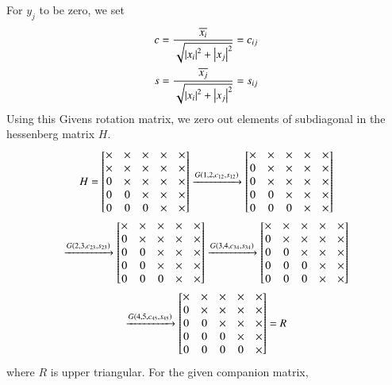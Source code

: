 \documentclass[journal]{IEEEtran}
\numberwithin{equation}{enumi}
\numberwithin{figure}{enumi}
\begin{document}
For $y_j$ to be zero, we set
\begin{align}
	c = \frac{\overline{x_i}}{\sqrt{\left\vert x_i\right\vert^2 + \left\vert x_j\right\vert^2}} = c_{ij}\\
	s = \frac{\overline{x_j}}{\sqrt{\left\vert x_i\right\vert^2 + \left\vert x_j\right\vert^2}} = s_{ij}
\end{align}
Using this Givens rotation matrix, we zero out elements of subdiagonal in the hessenberg matrix $H$.
\begin{multline}
	H = \begin{bmatrix}
		\times & \times & \times & \times & \times\\
		\times & \times & \times & \times & \times\\
		0 & \times & \times & \times & \times\\
		0 & 0 & \times & \times & \times\\
		0 & 0 & 0 & \times & \times
	\end{bmatrix} \xrightarrow{G\left(1, 2, c_{12}, s_{12}\right)}
	\begin{bmatrix}
		\times & \times & \times & \times & \times\\
		0 & \times & \times & \times & \times\\
		0 & \times & \times & \times & \times\\
		0 & 0 & \times & \times & \times\\
		0 & 0 & 0 & \times & \times
	\end{bmatrix} \\\xrightarrow{G\left(2, 3, c_{23}, s_{23}\right)}
	\begin{bmatrix}
		\times & \times & \times & \times & \times\\
		0 & \times & \times & \times & \times\\
		0 & 0 & \times & \times & \times\\
		0 & 0 & \times & \times & \times\\
		0 & 0 & 0 & \times & \times
	\end{bmatrix} \xrightarrow{G\left(3, 4, c_{34}, s_{34}\right)}
	\begin{bmatrix}
		\times & \times & \times & \times & \times\\
		0 & \times & \times & \times & \times\\
		0 & 0 & \times & \times & \times\\
		0 & 0 & 0 & \times & \times\\
		0 & 0 & 0 & \times & \times
	\end{bmatrix} \\\xrightarrow{G\left(4, 5, c_{45}, s_{45}\right)}
	\begin{bmatrix}
		\times & \times & \times & \times & \times\\
		0 & \times & \times & \times & \times\\
		0 & 0 & \times & \times & \times\\
		0 & 0 & 0 & \times & \times\\
		0 & 0 & 0 & 0 & \times
	\end{bmatrix} = R
\end{multline}
where $R$ is upper triangular.
For the given companion matrix,
\end{document}

